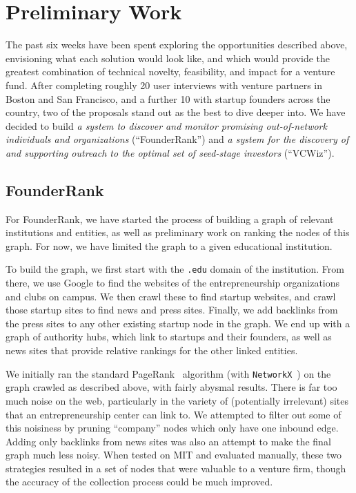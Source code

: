 \section{Preliminary Work}

The past six weeks have been spent exploring the opportunities described above, envisioning what each solution would look like, and which would provide the greatest combination of technical novelty, feasibility, and impact for a venture fund. After completing roughly 20 user interviews with venture partners in Boston and San Francisco, and a further 10 with startup founders across the country, two of the proposals stand out as the best to dive deeper into. We have decided to build \textit{a system to discover and monitor promising out-of-network individuals and organizations} (``FounderRank'') and \textit{a system for the discovery of and supporting outreach to the optimal set of seed-stage investors} (``VCWiz'').

\subsection{FounderRank}

For FounderRank, we have started the process of building a graph of relevant institutions and entities, as well as preliminary work on ranking the nodes of this graph. For now, we have limited the graph to a given educational institution.

To build the graph, we first start with the \texttt{.edu} domain of the institution. From there, we use Google to find the websites of the entrepreneurship organizations and clubs on campus. We then crawl these to find startup websites, and crawl those startup sites to find news and press sites. Finally, we add backlinks from the press sites to any other existing startup node in the graph. We end up with a graph of authority hubs, which link to startups and their founders, as well as news sites that provide relative rankings for the other linked entities.


We initially ran the standard PageRank~\cite{page1999pagerank} algorithm (with \texttt{NetworkX}~\cite{networkx}) on the graph crawled as described above, with fairly abysmal results. There is far too much noise on the web, particularly in the variety of (potentially irrelevant) sites that an entrepreneurship center can link to. We attempted to filter out some of this noisiness by pruning ``company'' nodes which only have one inbound edge. Adding only backlinks from news sites was also an attempt to make the final graph much less noisy. When tested on MIT and evaluated manually, these two strategies resulted in a set of nodes that were valuable to a venture firm, though the accuracy of the collection process could be much improved.

